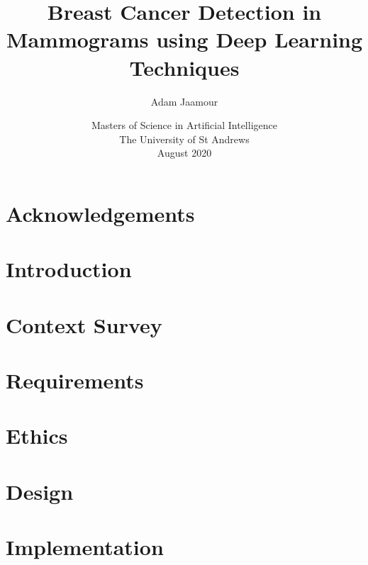 \documentclass[11pt,openright,twoside,a4paper]{report}
\title{Breast Cancer Detection in Mammograms using Deep Learning Techniques}
\author{Adam Jaamour}
\date{Masters of Science in Artificial Intelligence\\The University of St Andrews\\August 2020}
\begin{document}
\setcounter{page}{0}

\maketitle
\newpage

\newpage

\abstract

\newpage

\setcounter{tocdepth}{3}
\tableofcontents
\newpage
\listoffigures
\newpage
\listoftables
\newpage

\chapter*{Acknowledgements}

\newpage


\setcounter{page}{1}

\chapter{Introduction}
\label{ch:chapter1}


\chapter{Context Survey}
\label{ch:chapter2}


\chapter{Requirements}
\label{ch:chapter3}


\chapter{Ethics}
\label{ch:chapter4}


\chapter{Design}
\label{ch:chapter5}


\chapter{Implementation}
\label{ch:chapter6}

\end{document}
